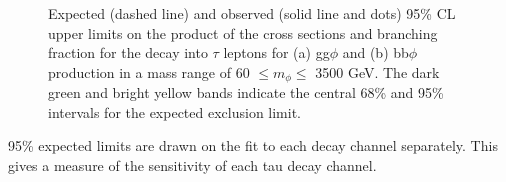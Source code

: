 \begin{figure}[!hbtp]
\centering
\caption{Expected (dashed line) and observed (solid line and dots) 95\% CL upper limits on the product of the cross sections and branching fraction for the decay into $\tau$ leptons for (a) gg$\phi$ and (b) bb$\phi$ production in a mass range of 60 $\leq m_{\phi} \leq$ 3500 GeV.  The dark green and bright yellow bands indicate the central 68\% and 95\% intervals for the expected exclusion limit.}
\label{fig:model_independent_limits}
\end{figure}

95\% expected limits are drawn on the fit to each decay channel separately.
This gives a measure of the sensitivity of each tau decay channel.

